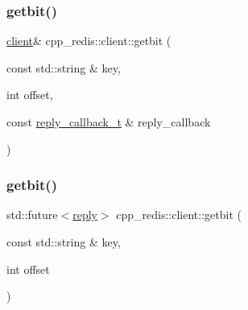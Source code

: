 \mbox{\label{classcpp__redis_1_1client_ad57b10f052814a2a15d4687e34d2be72}} 
\subsubsection{\texorpdfstring{getbit()}{getbit()}\hspace{0.1cm}{\footnotesize\ttfamily [1/2]}}
{\footnotesize\ttfamily \hyperlink{classcpp__redis_1_1client}{client}\& cpp\+\_\+redis\+::client\+::getbit (\begin{DoxyParamCaption}\item[{const std\+::string \&}]{key,  }\item[{int}]{offset,  }\item[{const \hyperlink{classcpp__redis_1_1client_a061a1140d36d2eaeda82b09a0bb3f9f2}{reply\+\_\+callback\+\_\+t} \&}]{reply\+\_\+callback }\end{DoxyParamCaption})}

\mbox{\label{classcpp__redis_1_1client_a43caae473008353b5ddc74a8fb36298c}} 
\subsubsection{\texorpdfstring{getbit()}{getbit()}\hspace{0.1cm}{\footnotesize\ttfamily [2/2]}}
{\footnotesize\ttfamily std\+::future$<$\hyperlink{classcpp__redis_1_1reply}{reply}$>$ cpp\+\_\+redis\+::client\+::getbit (\begin{DoxyParamCaption}\item[{const std\+::string \&}]{key,  }\item[{int}]{offset }\end{DoxyParamCaption})}

\mbox{\label{classcpp__redis_1_1client_a28b3fe6983918c6fc5549f1310742df1}} 
